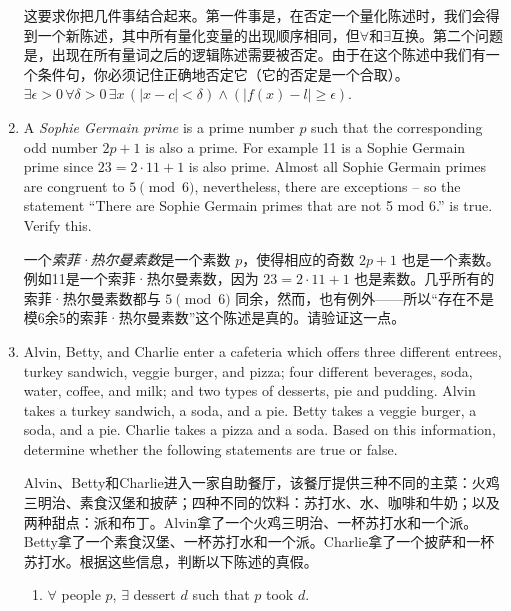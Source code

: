 \begin{enumerate}
{    这要求你把几件事结合起来。第一件事是，在否定一个量化陈述时，我们会得到一个新陈述，其中所有量化变量的出现顺序相同，但$\forall$和$\exists$互换。第二个问题是，出现在所有量词之后的逻辑陈述需要被否定。由于在这个陈述中我们有一个条件句，你必须记住正确地否定它（它的否定是一个合取）。
    $\displaystyle \exists \epsilon>0 \, \forall 
    \delta>0 \, \exists x \, (|x-c| < \delta)  \land  (|f(x)-l| \geq \epsilon) $.
    }
    
    \wbvfill
    
    \item A  \emph{Sophie Germain prime} is a prime number $p$
    such that the corresponding odd number $2p+1$ is also a prime.
    For example 11 is a 
    Sophie Germain prime since $23 = 2\cdot 11 + 1$ is also prime.
    Almost all Sophie Germain
    primes are congruent to $5 \pmod{6}$, nevertheless, there are exceptions -- so the
    statement ``There are Sophie Germain primes that are not 5 mod 6.'' is true.
    Verify this.
    
    一个\emph{索菲·热尔曼素数}是一个素数 $p$，使得相应的奇数 $2p+1$ 也是一个素数。例如11是一个索菲·热尔曼素数，因为 $23 = 2\cdot 11 + 1$ 也是素数。几乎所有的索菲·热尔曼素数都与 $5 \pmod{6}$ 同余，然而，也有例外——所以“存在不是模6余5的索菲·热尔曼素数”这个陈述是真的。请验证这一点。
    
    
    \wbvfill
    
    \workbookpagebreak
    
    \item  Alvin, Betty, and Charlie enter a cafeteria which offers three different
    entrees, turkey sandwich, veggie burger, and pizza;
    four different
    beverages, soda, water, coffee, and milk; and two types of desserts,
    pie and pudding.
    Alvin takes a turkey sandwich, a soda, and a pie.
    Betty takes a veggie burger, a soda, and a pie.
    Charlie takes a pizza
    and a soda.  Based on this information, determine whether the following
    statements are true or false.
    
    Alvin、Betty和Charlie进入一家自助餐厅，该餐厅提供三种不同的主菜：火鸡三明治、素食汉堡和披萨；四种不同的饮料：苏打水、水、咖啡和牛奶；以及两种甜点：派和布丁。Alvin拿了一个火鸡三明治、一杯苏打水和一个派。Betty拿了一个素食汉堡、一杯苏打水和一个派。Charlie拿了一个披萨和一杯苏打水。根据这些信息，判断以下陈述的真假。
    \begin{enumerate}
    \item \label{negated} \wbitemsep $\forall$ people $p$, $\exists$ dessert $d$ such that $ p$
    took $d$.
    

\end{enumerate}
\end{enumerate}
